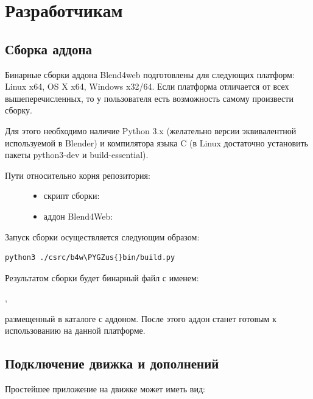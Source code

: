 \documentclass[a4paper,12pt,oneside]{sphinxmanual}
\def\PYGZus{\char`\_}
\begin{document}
\chapter{Разработчикам}
\label{developers:developers}\label{developers::doc}\label{developers:id1}

\section{Сборка аддона}
\label{developers:id2}
Бинарные сборки аддона Blend4web подготовлены для следующих платформ: Linux x64, OS X x64, Windows x32/64.
Если платформа отличается от всех вышеперечисленных, то у пользователя есть возможность самому произвести сборку.

Для этого необходимо наличие Python 3.x (желательно версии эквивалентной используемой в Blender) и компилятора языка C (в Linux достаточно установить пакеты python3-dev и build-essential).
\begin{description}
\item[{Пути относительно корня репозитория:}] \leavevmode\begin{itemize}
\item {} 
скрипт сборки: 

\item {} 
аддон Blend4Web: 

\end{itemize}

\end{description}

Запуск сборки осуществляется следующим образом:

\begin{Verbatim}[commandchars=\\\{\}]
python3 ./csrc/b4w\PYGZus{}bin/build.py
\end{Verbatim}

Результатом сборки будет бинарный файл с именем:

,

размещенный в каталоге с аддоном. После этого аддон станет готовым к использованию на данной платформе.


\section{Подключение движка и дополнений}
\label{developers:id3}
Простейшее приложение на движке может иметь вид:
\end{document}
